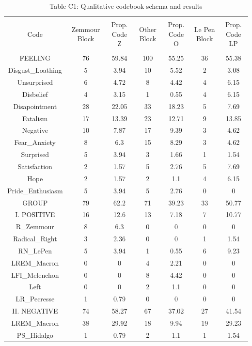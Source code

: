 
\begin{table}[!htbp] \centering 
  \caption{Table C1: Qualitative codebook schema and results} 
  \label{} 
\tiny 
\begin{tabular}{@{\extracolsep{0.01pt}} ccccccc} 
\\[-1.8ex]\hline 
\hline \\[-1.8ex] 
Code & Zemmour Block & Prop. Code Z & Other Block & Prop. Code O & Le Pen Block & Prop. Code LP \\ 
\hline \\[-1.8ex] 
FEELING & 76 & 59.84 & 100 & 55.25 & 36 & 55.38 \\ 
Disgust\_Loathing & 5 & 3.94 & 10 & 5.52 & 2 & 3.08 \\ 
Unsurprised & 6 & 4.72 & 8 & 4.42 & 4 & 6.15 \\ 
Disbelief & 4 & 3.15 & 1 & 0.55 & 4 & 6.15 \\ 
Disapointment & 28 & 22.05 & 33 & 18.23 & 5 & 7.69 \\ 
Fatalism & 17 & 13.39 & 23 & 12.71 & 9 & 13.85 \\ 
Negative & 10 & 7.87 & 17 & 9.39 & 3 & 4.62 \\ 
Fear\_Anxiety & 8 & 6.3 & 15 & 8.29 & 3 & 4.62 \\ 
Surprised & 5 & 3.94 & 3 & 1.66 & 1 & 1.54 \\ 
Satisfaction & 2 & 1.57 & 5 & 2.76 & 5 & 7.69 \\ 
Hope & 2 & 1.57 & 2 & 1.1 & 4 & 6.15 \\ 
Pride\_Enthusiasm & 5 & 3.94 & 5 & 2.76 & 0 & 0 \\ 
GROUP & 79 & 62.2 & 71 & 39.23 & 33 & 50.77 \\ 
I. POSITIVE & 16 & 12.6 & 13 & 7.18 & 7 & 10.77 \\ 
R\_Zemmour & 8 & 6.3 & 0 & 0 & 0 & 0 \\ 
Radical\_Right & 3 & 2.36 & 0 & 0 & 1 & 1.54 \\ 
RN\_LePen & 5 & 3.94 & 1 & 0.55 & 6 & 9.23 \\ 
LREM\_Macron & 0 & 0 & 4 & 2.21 & 0 & 0 \\ 
LFI\_Melenchon & 0 & 0 & 8 & 4.42 & 0 & 0 \\ 
Left & 0 & 0 & 2 & 1.1 & 0 & 0 \\ 
LR\_Pecresse & 1 & 0.79 & 0 & 0 & 0 & 0 \\ 
II. NEGATIVE & 74 & 58.27 & 67 & 37.02 & 27 & 41.54 \\ 
LREM\_Macron & 38 & 29.92 & 18 & 9.94 & 19 & 29.23 \\ 
PS\_Hidalgo & 1 & 0.79 & 2 & 1.1 & 1 & 1.54 \\ 

\end{tabular}
\end{table}

